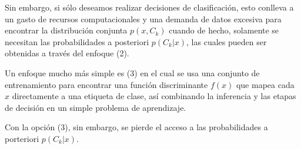 	Sin embargo, si sólo deseamos realizar decisiones de clasificación, esto conlleva a un gasto de recursos computacionales y una demanda de datos excesiva para encontrar la distribución conjunta $p(x, C_k)$ cuando de hecho, solamente se necesitan las probabilidades a posteriori $p(C_k \vert x)$, las cuales pueden ser obtenidas a través del enfoque (2). 
		
	Un enfoque mucho más simple es (3) en el cual se usa una conjunto de entrenamiento para encontrar una función discriminante $f(x)$ que mapea cada $x$ directamente a una etiqueta de clase, así combinando la inferencia y las etapas de decisión en un simple problema de aprendizaje.
		
	Con la opción (3), sin embargo, se pierde el acceso a las probabilidades a porteriori $p(C_k \vert x)$. 